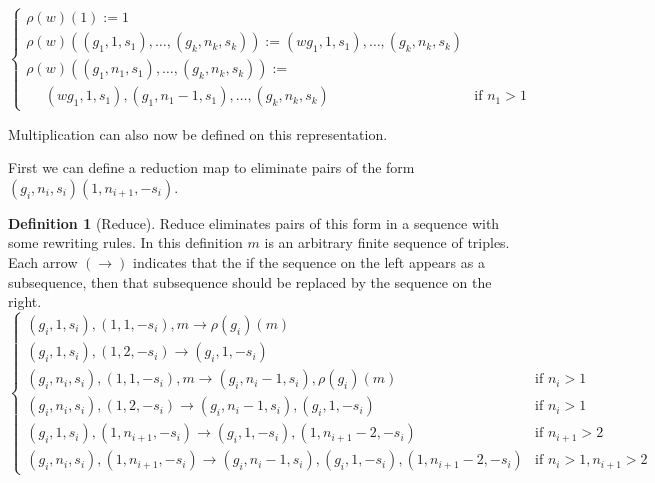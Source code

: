 \documentclass[12pt]{article} %
\theoremstyle{definition}
\theoremstyle{definition}
\theoremstyle{definition}
\theoremstyle{definition}
\newtheorem{defn}[thm]{Definition}
\begin{document}
\begin{equation}
  \begin{cases}
    \rho(w)(1) := 1 \\
    \rho(w)((g_1, 1, s_1), \dots ,(g_k, n_k, s_k)) := (wg_1, 1, s_1), \dots, (g_k, n_k, s_k)\\
    \rho(w)((g_1, n_1, s_1),\dots ,(g_k, n_k, s_k)) := \\
     \ \ \ \ \ \ (wg_1, 1, s_1),(g_1, n_1 - 1, s_1),\dots,(g_k, n_k, s_k) & \text{if }n_1 > 1
  \end{cases}
\end{equation}

Multiplication can also now be defined on this representation.

First we can define a reduction map to eliminate pairs of the form
 $(g_i, n_i, s_i)(1, n_{i+1}, -s_i)$.
\begin{defn}[Reduce]
  Reduce eliminates pairs of this form in a sequence with some rewriting rules.
  In this definition $m$ is an arbitrary finite sequence of triples. Each arrow $(\to)$ indicates
  that the if the sequence on the left appears as a subsequence, then
  that subsequence should be replaced by the sequence on the right.
  \begin{equation}
    \begin{cases}
    (g_i, 1, s_i), (1, 1, -s_i), m \to \rho(g_i)(m) \\
    (g_i, 1, s_i), (1, 2, -s_i) \to
      (g_i, 1, -s_i) &  \\
    (g_i, n_i, s_i), (1, 1, -s_i), m \to (g_i, n_i - 1, s_i),
      \rho(g_i)(m) & \text{if } n_i > 1\\
    (g_i, n_i, s_i), (1, 2, -s_i) \to (g_i, n_i - 1, s_i), (g_i, 1, -s_i) & \text{if } n_i > 1\\
    (g_i, 1, s_i), (1, n_{i+1}, -s_i) \to
      (g_i, 1, -s_i), (1, n_{i+1} - 2, -s_i) &\text{if } n_{i+1} > 2 \\
    (g_i, n_i, s_i), (1, n_{i+1}, -s_i) \to
    (g_i, n_i - 1, s_i), (g_i, 1, -s_i), (1, n_{i + 1} - 2, -s_i) &
      \text{if } n_i > 1, n_{i+1} > 2
    \end{cases}
  \end{equation}

\end{defn}
\end{document}
